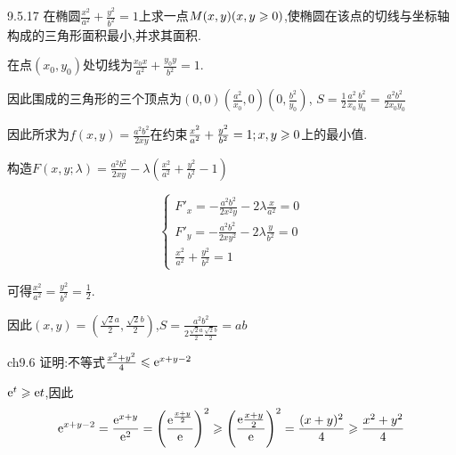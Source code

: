 \begin{exercise}{9.5.17}
   在椭圆$\frac{x^2}{a^2}+\frac{y^2}{b^2}=1$上求一点$M(x,y)(x,y\geqslant0)$,使椭圆在该点的切线与坐标轴构成的三角形面积最小,并求其面积.
\end{exercise}
\begin{solution}
    在点$(x_0,y_0)$处切线为$\frac{x_0x}{a^2}+\frac{y_0y}{b^2}=1$.

    因此围成的三角形的三个顶点为$(0,0)(\frac{a^2}{x_0},0)(0,\frac{b^2}{y_0})$,
    $S=\frac{1}{2}\frac{a^2}{x_0}\frac{b^2}{y_0}=\frac{a^2b^2}{2x_0y_0}$
    
    因此所求为$f(x,y)=\frac{a^2b^2}{2xy}$在约束$\frac{x^2}{a^2}+\frac{y^2}{b^2}=1;x,y\geqslant0$上的最小值.

    构造$F(x,y;\lambda)=\frac{a^2b^2}{2xy}-\lambda(\frac{x^2}{a^2}+\frac{y^2}{b^2}-1)$

    $$\begin{cases}
        F'_x=-\frac{a^2b^2}{2x^2y}-2\lambda\frac{x}{a^2}=0\\
        F'_y=-\frac{a^2b^2}{2xy^2}-2\lambda\frac{y}{b^2}=0\\
        \frac{x^2}{a^2}+\frac{y^2}{b^2}=1
    \end{cases}$$

    可得$\frac{x^2}{a^2}=\frac{y^2}{b^2}=\frac{1}{2}$.

    因此$(x,y)=(\frac{\sqrt{2}a}{2},\frac{\sqrt{2}b}{2})$,$S=\frac{a^2b^2}{2\frac{\sqrt{2}a}{2}\frac{\sqrt{2}b}{2}}=ab$
\end{solution}

\begin{exercise}{ch9.6}
    证明:不等式$\frac{x^2+y^2}{4}\leqslant\mathrm{e}^{x+y-2}$
\end{exercise}
\begin{solution}
   $\mathrm{e}^t\geqslant \mathrm{e} t$,因此
   \begin{align*}
        \mathrm{e}^{x+y-2}
        =\frac{\mathrm{e}^{x+y}}{\mathrm{e}^2}
        =\left(\frac{\mathrm{e}^{\frac{x+y}{2}}}{\mathrm{e}}\right)^2
        \geqslant \left(\frac{\mathrm{e}\frac{x+y}{2}}{\mathrm{e}}\right)^2
        =\frac{(x+y)^2}{4}
        \geqslant \frac{x^2+y^2}{4}
   \end{align*}
\end{solution}

